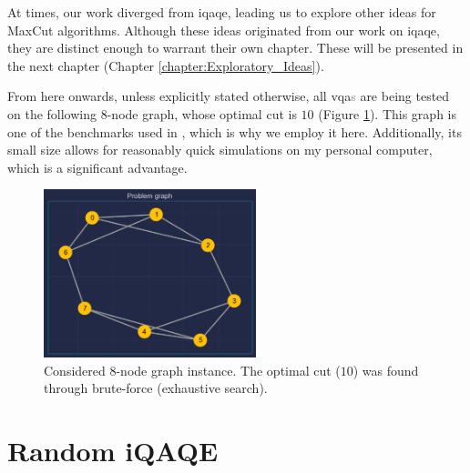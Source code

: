 At times, our work diverged from \acrshort{iqaqe}, leading us to explore other ideas for MaxCut algorithms. Although these ideas originated from our work on \acrshort{iqaqe}, they are distinct enough to warrant their own chapter. These will be presented in the next chapter (Chapter \ref{chapter:Exploratory_Ideas}).

From here onwards, unless explicitly stated otherwise, all \acrshort{vqa}\textcolor{gray}{s} are being tested on the following $8$-node graph, whose optimal cut is $10$ (Figure \ref{fig:8_node_graph}). This graph is one of the benchmarks used in \cite{tenecohen2023variational}, which is why we employ it here. Additionally, its small size allows for reasonably quick simulations on my personal computer, which is a significant advantage.

\begin{figure}[H]
    \centering
    \includegraphics[width=0.55\textwidth]{Figures/Chapter_5/problem_graph.png}
    \caption{Considered $8$-node graph instance. The optimal cut ($10$) was found through
    brute-force (exhaustive search).}
    \label{fig:8_node_graph}
\end{figure}

\section{Random iQAQE}
\label{section:Base_iQAQE}


